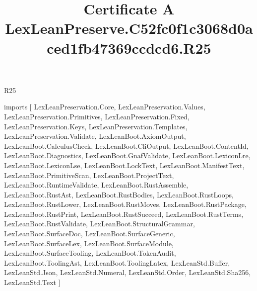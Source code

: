 \begin{lexlean}{R25}
\title{Certificate A LexLeanPreserve.C52fc0f1c3068d0aced1fb47369ccdcd6.R25}
\begin{coremodule}
imports [
  LexLeanPreservation.Core,
  LexLeanPreservation.Values,
  LexLeanPreservation.Primitives,
  LexLeanPreservation.Fixed,
  LexLeanPreservation.Keys,
  LexLeanPreservation.Templates,
  LexLeanPreservation.Validate,
  LexLeanBoot.AxiomOutput,
  LexLeanBoot.CalculusCheck,
  LexLeanBoot.CliOutput,
  LexLeanBoot.ContentId,
  LexLeanBoot.Diagnostics,
  LexLeanBoot.GnafValidate,
  LexLeanBoot.LexiconLre,
  LexLeanBoot.LexiconLse,
  LexLeanBoot.LockText,
  LexLeanBoot.ManifestText,
  LexLeanBoot.PrimitiveScan,
  LexLeanBoot.ProjectText,
  LexLeanBoot.RuntimeValidate,
  LexLeanBoot.RustAssemble,
  LexLeanBoot.RustAst,
  LexLeanBoot.RustBodies,
  LexLeanBoot.RustLoops,
  LexLeanBoot.RustLower,
  LexLeanBoot.RustMoves,
  LexLeanBoot.RustPackage,
  LexLeanBoot.RustPrint,
  LexLeanBoot.RustSucceed,
  LexLeanBoot.RustTerms,
  LexLeanBoot.RustValidate,
  LexLeanBoot.StructuralGrammar,
  LexLeanBoot.SurfaceDoc,
  LexLeanBoot.SurfaceGeneric,
  LexLeanBoot.SurfaceLex,
  LexLeanBoot.SurfaceModule,
  LexLeanBoot.SurfaceTooling,
  LexLeanBoot.TokenAudit,
  LexLeanBoot.ToolingAst,
  LexLeanBoot.ToolingLatex,
  LexLeanStd.Buffer,
  LexLeanStd.Json,
  LexLeanStd.Numeral,
  LexLeanStd.Order,
  LexLeanStd.Sha256,
  LexLeanStd.Text
]


\end{coremodule}
\end{lexlean}
